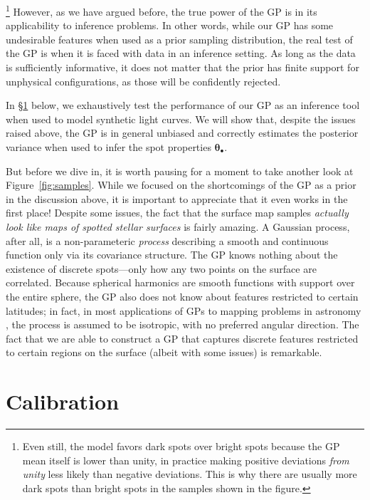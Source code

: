 \documentclass[modern]{aastex62}
\begin{document}
\footnote{
    Even still, the model favors dark spots over bright spots because the GP mean
    itself is lower than unity, in practice making
    positive deviations \emph{from unity} less likely than negative
    deviations. This is why there are usually more dark spots than bright spots in
    the samples shown in the figure.
}
However, as we have argued before, the true power of the GP is in its
applicability to inference problems. In other words, while our GP has some
undesirable features when used as a prior sampling distribution, the real test
of the GP is when it is faced with data in an inference setting.
As long as the data is sufficiently informative, it does not matter that the
prior has finite support for unphysical configurations, as those
will be confidently rejected.

In \S\ref{sec:calibration} below, we exhaustively test the performance of our
GP as an inference tool when used to model synthetic light curves. We will
show that, despite the issues raised above, the GP is in general unbiased and
correctly estimates the posterior variance when used to infer the spot
properties $\pmb{\theta}_\bullet$.

But before we dive in, it is worth pausing for a moment to take another
look at Figure~\ref{fig:samples}. While we focused on the shortcomings of
the GP as a prior in the discussion above, it is important to appreciate
that it even works in the first place! Despite some issues, the fact that
the surface map samples \emph{actually look like maps of spotted stellar surfaces}
is fairly amazing. A Gaussian process, after all, is a non-parameteric
\emph{process} describing a smooth and continuous function only via its
covariance structure. The GP knows nothing about the existence of discrete
spots---only how any two points on the surface are correlated.
Because spherical harmonics are smooth functions with support over the
entire sphere, the GP also does not know about features restricted
to certain latitudes; in fact, in most applications of GPs to mapping
problems in astronomy \citep[such as in models of the cosmic microwave
    background][]{?}, the process is assumed to be isotropic,
with no preferred angular direction.
The fact that we are able to construct a GP that captures discrete
features restricted to certain regions on the surface (albeit with
some issues) is remarkable.

\section{Calibration}
\label{sec:calibration}
\end{document}
